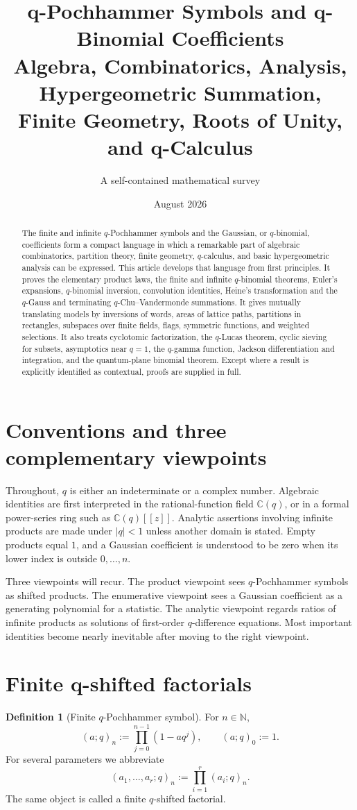 \documentclass[11pt]{article}
\title{\bfseries q-Pochhammer Symbols and q-Binomial Coefficients\\[3mm]
Algebra, Combinatorics, Analysis, Hypergeometric Summation,\\Finite Geometry, Roots of Unity, and q-Calculus}
\author{A self-contained mathematical survey}
\date{August 2026}
\numberwithin{equation}{section}
\theoremstyle{definition}
\newtheorem{definition}[theorem]{Definition}
\newcommand{\N}{\mathbb N}
\newcommand{\C}{\mathbb C}
\begin{document}
\maketitle
\begin{abstract}
The finite and infinite $q$-Pochhammer symbols and the Gaussian, or $q$-binomial, coefficients form a compact language in which a remarkable part of algebraic combinatorics, partition theory, finite geometry, $q$-calculus, and basic hypergeometric analysis can be expressed.  This article develops that language from first principles.  It proves the elementary product laws, the finite and infinite $q$-binomial theorems, Euler's expansions, $q$-binomial inversion, convolution identities, Heine's transformation and the $q$-Gauss and terminating $q$-Chu--Vandermonde summations.  It gives mutually translating models by inversions of words, areas of lattice paths, partitions in rectangles, subspaces over finite fields, flags, symmetric functions, and weighted selections.  It also treats cyclotomic factorization, the $q$-Lucas theorem, cyclic sieving for subsets, asymptotics near $q=1$, the $q$-gamma function, Jackson differentiation and integration, and the quantum-plane binomial theorem.  Except where a result is explicitly identified as contextual, proofs are supplied in full.
\end{abstract}
\tableofcontents

\section{Conventions and three complementary viewpoints}
Throughout, $q$ is either an indeterminate or a complex number.  Algebraic identities are first interpreted in the rational-function field $\C(q)$, or in a formal power-series ring such as $\C(q)[[z]]$.  Analytic assertions involving infinite products are made under $|q|<1$ unless another domain is stated.  Empty products equal $1$, and a Gaussian coefficient is understood to be zero when its lower index is outside $0,\ldots,n$.

Three viewpoints will recur.  The product viewpoint sees $q$-Pochhammer symbols as shifted products.  The enumerative viewpoint sees a Gaussian coefficient as a generating polynomial for a statistic.  The analytic viewpoint regards ratios of infinite products as solutions of first-order $q$-difference equations.  Most important identities become nearly inevitable after moving to the right viewpoint.

\section{Finite q-shifted factorials}
\begin{definition}[Finite $q$-Pochhammer symbol]
For $n\in\N$,
\[
 (a;q)_n:=\prod_{j=0}^{n-1}(1-aq^j),\qquad (a;q)_0:=1.
\]
For several parameters we abbreviate
\[
 (a_1,\ldots,a_r;q)_n:=\prod_{i=1}^r(a_i;q)_n.
\]
The same object is called a finite $q$-shifted factorial.
\end{definition}
\end{document}
